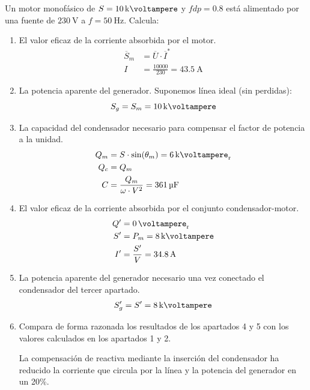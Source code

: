 \documentclass[12pt]{article}
\begin{document}
Un motor monofásico de $S = \SI{10}{\kilo\voltampere}$ y $fdp = 0.8$ está alimentado por una fuente de $\SI{230}{\volt}$ a $f = \SI{50}{\hertz}$. 
Calcula:
\begin{enumerate}
\item El valor eficaz de la corriente absorbida por el motor.
\begin{align*}
  \overline{S}_m &= \overline{U} \cdot \overline{I}^*\\
%
  I &= \frac{\num{10000}}{230} = \SI{43.5}{\ampere}
\end{align*}

\item La potencia aparente del generador.
Suponemos línea ideal (sin perdidas):
\[
  S_g = S_m = \SI{10}{\kilo\voltampere} 
\]

\item La capacidad del condensador necesario para compensar el factor de potencia a la unidad.
\begin{align*}
Q_m &= S \cdot \sin(\theta_m) = \SI{6}{\kilo\voltampere_r}\\
Q_c &= Q_m\\
C &= \frac{Q_m}{\omega \cdot V^2} = \SI{361}{\micro\farad}
\end{align*}

\item El valor eficaz de la corriente absorbida por el conjunto condensador-motor. 
\begin{align*}
Q' &= \SI{0}{\voltampere_r}\\
S' &= P_m = \SI{8}{\kilo\voltampere}\\
I' &= \frac{S'}{V} = \SI{34.8}{\ampere}
\end{align*}

\item La potencia aparente del generador necesario una vez conectado el condensador del tercer apartado.
\begin{align*}
S'_g &= S' = \SI{8}{\kilo\voltampere}\\
\end{align*}

\item Compara de forma razonada los resultados de los apartados 4 y 5 con los valores calculados en los apartados 1 y 2.

  La compensación de reactiva mediante la inserción del condensador ha reducido la corriente que circula por la línea y la potencia del generador en un 20\%.

\end{enumerate}
\end{document}
